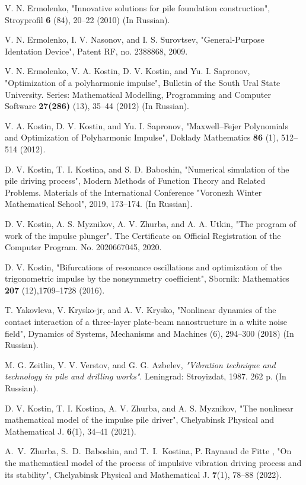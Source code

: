 \documentclass[
11pt,%
tightenlines,%
twoside,%
onecolumn,%
nofloats,%
nobibnotes,%
nofootinbib,%
superscriptaddress,%
noshowpacs,%
centertags]%
{revtex4}
\begin{document}
\begin{thebibliography}{99}

{V. N. Ermolenko, } "Innovative solutions for pile foundation
construction", { Stroyprofil} {\bf 6} (84), 20--22 (2010)  (In
Russian).

{ V. N. Ermolenko, I. V. Nasonov, and I. S. Surovtsev, }
"General-Purpose Identation Device", Patent RF, no. 2388868, 2009.

{V. N. Ermolenko, V. A. Kostin, D. V. Kostin, and Yu. I. Sapronov, }
"Optimization of a polyharmonic impulse", Bulletin of the South Ural
State University. Series: Mathematical Modelling, Programming and
Computer Software  {\bf 27(286)} (13), 35--44 (2012) (In Russian).


{ V. A. Kostin, D. V. Kostin, and Yu. I. Sapronov,} "Maxwell--Fejer
Polynomials and Optimization of Polyharmonic Impulse", Doklady
Mathematics {\bf 86} (1), 512--514 (2012).

{D. V. Kostin, T. I. Kostina, and S. D. Baboshin,} "Numerical
simulation of the pile driving process",  Modern Methods of Function
Theory and Related Problems. Materials of the International
Conference "Voronezh Winter Mathematical School", 2019, 173--174.
(In Russian).

{ D. V. Kostin, A. S. Myznikov, A. V. Zhurba, and A. A. Utkin, }
"The program of work of the impulse plunger". The Certificate on
Official Registration of the Computer Program. No. 2020667045, 2020.

{D. V. Kostin,} "Bifurcations of resonance oscillations and
optimization of the trigonometric impulse by the nonsymmetry
coefficient", Sbornik: Mathematics {\bf 207} (12),1709--1728 (2016).

{T. Yakovleva, V. Krysko-jr, and A. V. Krysko, } "Nonlinear dynamics
of the contact interaction of a three-layer plate-beam nanostructure
in a white noise field", Dynamics of Systems, Mechanisms and
Machines (6), 294--300 (2018) (In Russian).

{M. G. Zeitlin, V. V. Verstov, and G. G. Azbelev,} {\it "Vibration
technique and technology in pile and drilling works"}. Leningrad:
Stroyizdat, 1987. 262 p.   (In Russian).

{D. V. Kostin, T. I. Kostina, A. V. Zhurba, and A. S. Myznikov,}
"The nonlinear mathematical model of the impulse pile driver",
Chelyabinsk Physical and Mathematical J. {\bf 6}(1),  34--41 (2021).

A.~V.~Zhurba, S.~D.~Baboshin, and T.~I.~Kostina, P. Raynaud de Fitte
, "On the mathematical model of the process of impulsive vibration
driving process and its stability", Chelyabinsk Physical and
Mathematical J.  {\bf 7}(1), 78--88 (2022).
\end{thebibliography}
\end{document}
